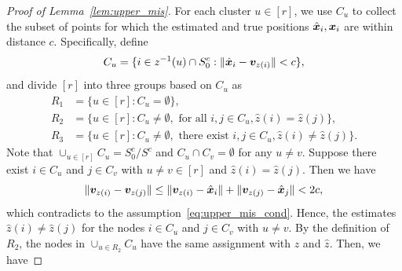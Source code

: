 \documentclass[journal]{IEEEtran}
\theoremstyle{definition}
\theoremstyle{definition}
\def\fixme#1#2{\textbf{\color{red}[FIXME (#1): #2]}}
\begin{document}
\begin{proof}[Proof of Lemma~\ref{lem:upper_mis}] 

For each cluster $u\in[r]$, we use $C_u$ to collect the subset of points for which the estimated and true positions $\hat {\bm x}_i, \bm x_i$ are within distance $c$. Specifically, define
\begin{equation}
    C_u = \{ i \in z^{-1}(u) \cap S_0^c: \lVert\hat {\bm x}_i - \bm{v}_{z(i)}\rVert < c \},
\end{equation}
and divide $[r]$ into three groups based on $C_u$ as 
\begin{align}
    R_1 &= \{ u \in [r]: C_u = \emptyset \},\\
    R_2 &= \{ u \in [r]: C_u \neq \emptyset, \text{ for all } i, j \in C_u, \hat z(i) = \hat z(j) \},\\
    R_3 &= \{ u \in [r]: C_u \neq \emptyset, \text{ there exist } i, j \in C_u, \hat z(i) \neq \hat z(j) \}.
\end{align}
Note that $\cup_{u \in [r]}C_u = S_0^c/S^c$ and $C_u \cap C_v = \emptyset$ for any $u \neq v$. Suppose there exist $ i \in C_u$ and $j \in C_v$ with $u \neq v \in [r]$ and $\hat z(i) = \hat z(j)$. Then we have 
\begin{equation}
    \lVert\bm{v}_{z(i)} - \bm{v}_{z(j)} \rVert \leq  \lVert\bm{v}_{z(i)} - \hat {\bm x}_{i} \rVert + \lVert\bm{v}_{z(j)} - \hat {\bm x}_j \rVert < 2c,
\end{equation}
which contradicts to the assumption~\eqref{eq:upper_mis_cond}. Hence, the estimates $\hat z(i) \neq \hat z(j)$ for the nodes $ i \in C_u$ and $j \in C_v$ with $u \neq v$. By the definition of $R_2$, the nodes in $\cup_{u \in R_2} C_u$ have the same assignment with $z$ and $\hat z$. Then, 
we have 


\end{proof}
\end{document}
